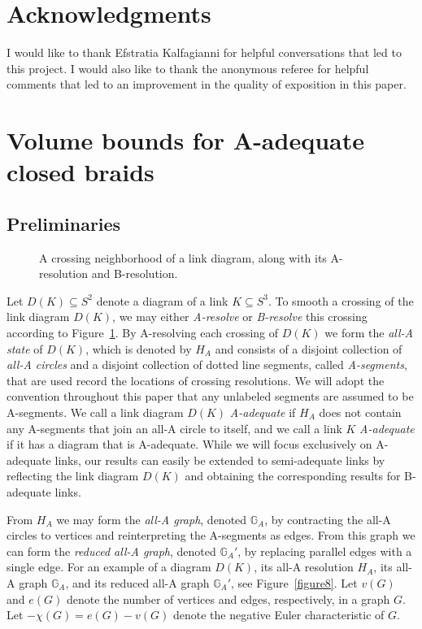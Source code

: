 \documentclass{article}
\begin{document}
\section*{Acknowledgments}
I would like to thank Efstratia Kalfagianni for helpful conversations that led to this project. I would also like to thank the anonymous referee for helpful comments that led to an improvement in the quality of exposition in this paper. 






\section{Volume bounds for A-adequate closed braids} 



\subsection{Preliminaries}

\begin{figure}
	\centering
		\def\svgwidth{2.5in}
		
	\caption{A crossing neighborhood of a link diagram, along with its A-resolution and B-resolution.}
	\label{resolutions}
\end{figure}

Let $D(K) \subseteq S^2$ denote a diagram of a link $K \subseteq S^3$. To smooth a crossing of the link diagram $D(K)$, we may either \emph{A-resolve} or \emph{B-resolve} this crossing according to Figure~\ref{resolutions}. By A-resolving each crossing of $D(K)$ we form the \emph{all-A state} of $D(K)$, which is denoted by $H_{A}$ and consists of a disjoint collection of \emph{all-A circles} and a disjoint collection of dotted line segments, called \emph{A-segments}, that are used record the locations of crossing resolutions. We will adopt the convention throughout this paper that any unlabeled segments are assumed to be A-segments. We call a link diagram $D(K)$ \emph{A-adequate} if $H_{A}$ does not contain any A-segments that join an all-A circle to itself, and we call a link $K$ \emph{A-adequate} if it has a diagram that is A-adequate. While we will focus exclusively on A-adequate links, our results can easily be extended to semi-adequate links by reflecting the link diagram $D(K)$ and obtaining the corresponding results for B-adequate links. 

From $H_{A}$ we may form the \emph{all-A graph}, denoted $\mathbb{G}_{A}$, by contracting the all-A circles to vertices and reinterpreting the A-segments as edges. From this graph we can form the \emph{reduced all-A graph}, denoted $\mathbb{G}_{A}'$, by replacing parallel edges with a single edge. For an example of a diagram $D(K)$, its all-A resolution $H_{A}$, its all-A graph $\mathbb{G}_{A}$, and its reduced all-A graph $\mathbb{G}_{A}'$, see Figure~\ref{figure8}. Let $v(G)$ and $e(G)$ denote the number of vertices and edges, respectively, in a graph $G$. Let $-\chi(G)=e(G)-v(G)$ denote the negative Euler characteristic of $G$. 
\end{document}

